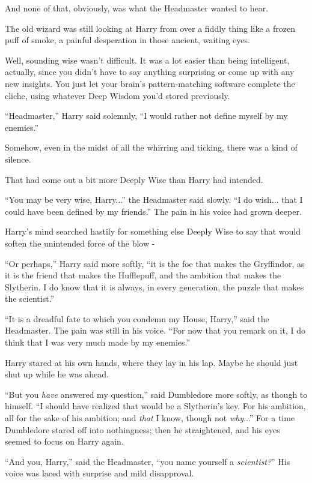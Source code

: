 And none of that, obviously, was what the Headmaster wanted to hear.

The old wizard was still looking at Harry from over a fiddly thing like a frozen puff of smoke, a painful desperation in those ancient, waiting eyes.

Well, sounding wise wasn't difficult. It was a lot easier than being intelligent, actually, since you didn't have to say anything surprising or come up with any new insights. You just let your brain's pattern-matching software complete the cliche, using whatever Deep Wisdom you'd stored previously.

``Headmaster,'' Harry said solemnly, ``I would rather not define myself by my enemies.''

Somehow, even in the midst of all the whirring and ticking, there was a kind of silence.

That had come out a bit more Deeply Wise than Harry had intended.

``You may be very wise, Harry...'' the Headmaster said slowly. ``I do wish... that I could have been defined by my friends.'' The pain in his voice had grown deeper.

Harry's mind searched hastily for something else Deeply Wise to say that would soften the unintended force of the blow -

``Or perhaps,'' Harry said more softly, ``it is the foe that makes the Gryffindor, as it is the friend that makes the Hufflepuff, and the ambition that makes the Slytherin. I do know that it is always, in every generation, the puzzle that makes the scientist.''

``It is a dreadful fate to which you condemn my House, Harry,'' said the Headmaster. The pain was still in his voice. ``For now that you remark on it, I do think that I was very much made by my enemies.''

Harry stared at his own hands, where they lay in his lap. Maybe he should just shut up while he was ahead.

``But you \emph{have} answered my question,'' said Dumbledore more softly, as though to himself. ``I should have realized that would be a Slytherin's key. For his ambition, all for the sake of his ambition; and \emph{that} I know, though not \emph{why}...'' For a time Dumbledore stared off into nothingness; then he straightened, and his eyes seemed to focus on Harry again.

``And you, Harry,'' said the Headmaster, ``you name yourself a \emph{scientist?}'' His voice was laced with surprise and mild disapproval.

